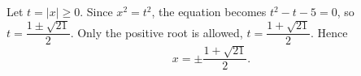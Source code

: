 Let $t=|x|\ge0$. Since $x^2=t^2$, the equation becomes $t^2-t-5=0$, so $t=\dfrac{1\pm\sqrt{21}}{2}$. Only the positive root is allowed, $t=\dfrac{1+\sqrt{21}}{2}$. Hence
\[x=\boxed{\pm\dfrac{1+\sqrt{21}}{2}}.\]
